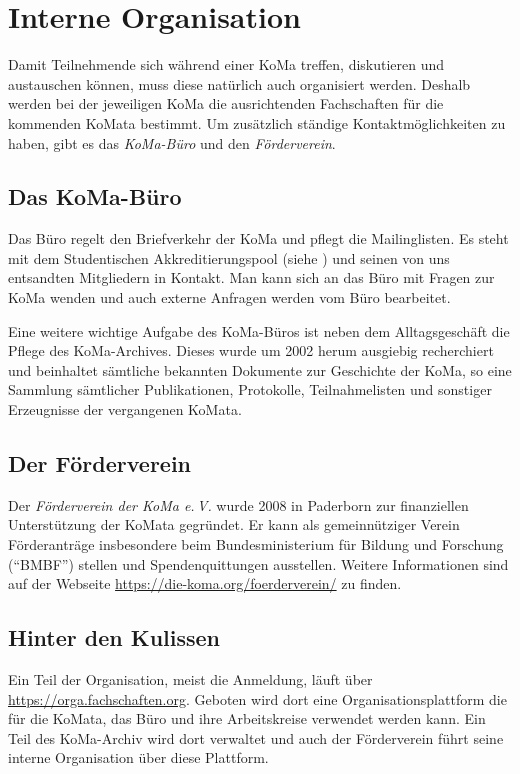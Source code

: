 \chapter{Interne Organisation}
Damit Teilnehmende sich während einer KoMa treffen, diskutieren und austauschen können, muss diese natürlich auch organisiert werden.
Deshalb werden bei der jeweiligen KoMa die ausrichtenden Fachschaften für die kommenden KoMata bestimmt.
Um zusätzlich ständige Kontaktmöglichkeiten zu haben, gibt es das \emph{KoMa-Büro} und den \emph{Förderverein}.

\section{Das KoMa-Büro}
Das Büro regelt den Briefverkehr der KoMa und pflegt die Mailinglisten.
Es steht mit dem Studentischen Akkreditierungspool (siehe ) und seinen von uns entsandten Mitgliedern in Kontakt.
Man kann sich an das Büro mit Fragen zur KoMa wenden und auch externe Anfragen werden vom Büro bearbeitet.

Eine weitere wichtige Aufgabe des KoMa-Büros ist neben dem Alltagsgeschäft die Pflege des KoMa-Archives.
Dieses wurde um 2002 herum ausgiebig recherchiert und beinhaltet sämtliche bekannten Dokumente zur Geschichte der KoMa, so eine Sammlung sämtlicher Publikationen, Protokolle, Teilnahmelisten und sonstiger Erzeugnisse der vergangenen KoMata.

\section{Der Förderverein}
Der \emph{Förderverein der KoMa e.\,V.} wurde 2008 in Paderborn zur finanziellen Unterstützung der KoMata gegründet.
Er kann als gemeinnütziger Verein Förderanträge insbesondere beim Bundesministerium für Bildung und Forschung (\enquote{BMBF}) stellen und Spendenquittungen ausstellen.  %
Weitere Informationen sind auf der Webseite \url{https://die-koma.org/foerderverein/} zu finden.

\section{Hinter den Kulissen}
Ein Teil der Organisation, meist die Anmeldung, läuft über \url{https://orga.fachschaften.org}.
Geboten wird dort eine Organisationsplattform die für die KoMata, das Büro und ihre Arbeitskreise verwendet werden kann.
Ein Teil des KoMa-Archiv wird dort verwaltet und auch der Förderverein führt seine interne Organisation über diese Plattform.
